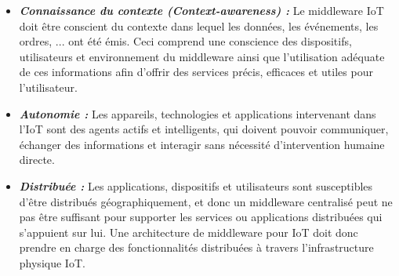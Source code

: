 \begin{itemize}
\item \textbf{\textit{Connaissance du contexte (Context-awareness) :}} Le middleware IoT doit être conscient du contexte dans lequel les données, les événements, les ordres, ... ont été émis. Ceci comprend une conscience des dispositifs, utilisateurs et environnement du middleware ainsi que l'utilisation adéquate de ces informations afin d'offrir des services précis, efficaces et utiles pour l'utilisateur.\\
\item \textbf{\textit{Autonomie :}} Les appareils, technologies et applications intervenant dans l'IoT sont des agents actifs et intelligents, qui doivent pouvoir communiquer, échanger des informations  et interagir sans nécessité d'intervention humaine directe.\\
\item \textbf{\textit{Distribuée :}} Les applications, dispositifs et utilisateurs sont susceptibles d'être distribués géographiquement, et donc un middleware centralisé peut ne pas être suffisant pour supporter les services ou applications distribuées qui s'appuient sur lui. Une architecture de middleware pour IoT doit donc prendre en charge des fonctionnalités distribuées à travers l'infrastructure physique IoT.\\
\end{itemize}